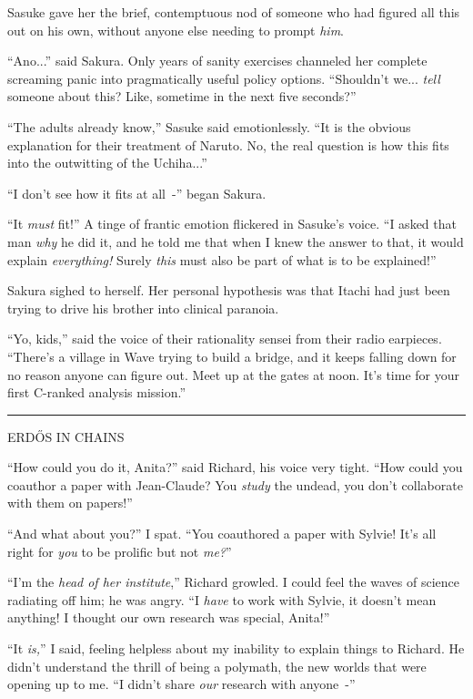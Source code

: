 Sasuke gave her the brief, contemptuous nod of someone who had figured all this out on his own, without anyone else needing to prompt \emph{him}.

``Ano...'' said Sakura. Only years of sanity exercises channeled her complete screaming panic into pragmatically useful policy options. ``Shouldn't we... \emph{tell} someone about this? Like, sometime in the next five seconds?''

``The adults already know,'' Sasuke said emotionlessly. ``It is the obvious explanation for their treatment of Naruto. No, the real question is how this fits into the outwitting of the Uchiha...''

``I don't see how it fits at all~-'' began Sakura.

``It \emph{must} fit!'' A tinge of frantic emotion flickered in Sasuke's voice. ``I asked that man \emph{why} he did it, and he told me that when I knew the answer to that, it would explain \emph{everything!} Surely \emph{this} must also be part of what is to be explained!''

Sakura sighed to herself. Her personal hypothesis was that Itachi had just been trying to drive his brother into clinical paranoia.

``Yo, kids,'' said the voice of their rationality sensei from their radio earpieces. ``There's a village in Wave trying to build a bridge, and it keeps falling down for no reason anyone can figure out. Meet up at the gates at noon. It's time for your first C-ranked analysis mission.''

\begin{center}\rule{3in}{0.4pt}\end{center}

ERDŐS IN CHAINS

``How could you do it, Anita?'' said Richard, his voice very tight. ``How could you coauthor a paper with Jean-Claude? You \emph{study} the undead, you don't collaborate with them on papers!''

``And what about you?'' I spat. ``You coauthored a paper with Sylvie! It's all right for \emph{you} to be prolific but not \emph{me?}''

``I'm the \emph{head of her institute},'' Richard growled. I could feel the waves of science radiating off him; he was angry. ``I \emph{have} to work with Sylvie, it doesn't mean anything! I thought our own research was special, Anita!''

``It \emph{is,}'' I said, feeling helpless about my inability to explain things to Richard. He didn't understand the thrill of being a polymath, the new worlds that were opening up to me. ``I didn't share \emph{our} research with anyone~-''

